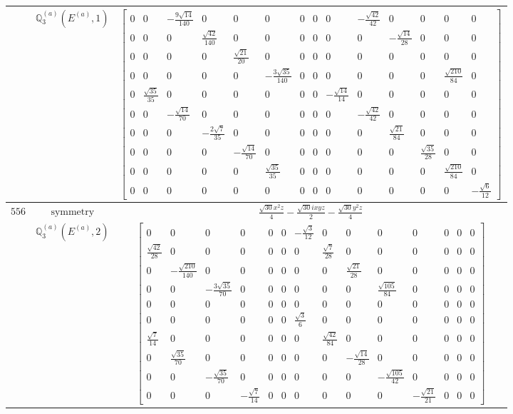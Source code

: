 \documentclass[fleqn,8pt,landscape]{jsarticle}
\begin{document}
\begin{longtable}{ccc}
$  $ & $ \mathbb{Q}_{3}^{(a)}(E^{(a)},1) $ & $ \begin{bmatrix} 0 & 0 & - \frac{9 \sqrt{14}}{140} & 0 & 0 & 0 & 0 & 0 & 0 & - \frac{\sqrt{42}}{42} & 0 & 0 & 0 & 0 \\ 0 & 0 & 0 & \frac{\sqrt{42}}{140} & 0 & 0 & 0 & 0 & 0 & 0 & - \frac{\sqrt{14}}{28} & 0 & 0 & 0 \\ 0 & 0 & 0 & 0 & \frac{\sqrt{21}}{20} & 0 & 0 & 0 & 0 & 0 & 0 & 0 & 0 & 0 \\ 0 & 0 & 0 & 0 & 0 & - \frac{3 \sqrt{35}}{140} & 0 & 0 & 0 & 0 & 0 & 0 & \frac{\sqrt{210}}{84} & 0 \\ 0 & \frac{\sqrt{35}}{35} & 0 & 0 & 0 & 0 & 0 & 0 & - \frac{\sqrt{14}}{14} & 0 & 0 & 0 & 0 & 0 \\ 0 & 0 & - \frac{\sqrt{14}}{70} & 0 & 0 & 0 & 0 & 0 & 0 & - \frac{\sqrt{42}}{42} & 0 & 0 & 0 & 0 \\ 0 & 0 & 0 & - \frac{2 \sqrt{7}}{35} & 0 & 0 & 0 & 0 & 0 & 0 & \frac{\sqrt{21}}{84} & 0 & 0 & 0 \\ 0 & 0 & 0 & 0 & - \frac{\sqrt{14}}{70} & 0 & 0 & 0 & 0 & 0 & 0 & \frac{\sqrt{35}}{28} & 0 & 0 \\ 0 & 0 & 0 & 0 & 0 & \frac{\sqrt{35}}{35} & 0 & 0 & 0 & 0 & 0 & 0 & \frac{\sqrt{210}}{84} & 0 \\ 0 & 0 & 0 & 0 & 0 & 0 & 0 & 0 & 0 & 0 & 0 & 0 & 0 & - \frac{\sqrt{6}}{12} \end{bmatrix} $ \\ \hline
$ 556 $ & $ \text{symmetry} $ & $ \frac{\sqrt{30} x^{2} z}{4} - \frac{\sqrt{30} i x y z}{2} - \frac{\sqrt{30} y^{2} z}{4} $ \\
$  $ & $ \mathbb{Q}_{3}^{(a)}(E^{(a)},2) $ & $ \begin{bmatrix} 0 & 0 & 0 & 0 & 0 & 0 & - \frac{\sqrt{3}}{12} & 0 & 0 & 0 & 0 & 0 & 0 & 0 \\ \frac{\sqrt{42}}{28} & 0 & 0 & 0 & 0 & 0 & 0 & \frac{\sqrt{7}}{28} & 0 & 0 & 0 & 0 & 0 & 0 \\ 0 & - \frac{\sqrt{210}}{140} & 0 & 0 & 0 & 0 & 0 & 0 & \frac{\sqrt{21}}{28} & 0 & 0 & 0 & 0 & 0 \\ 0 & 0 & - \frac{3 \sqrt{35}}{70} & 0 & 0 & 0 & 0 & 0 & 0 & \frac{\sqrt{105}}{84} & 0 & 0 & 0 & 0 \\ 0 & 0 & 0 & 0 & 0 & 0 & 0 & 0 & 0 & 0 & 0 & 0 & 0 & 0 \\ 0 & 0 & 0 & 0 & 0 & 0 & \frac{\sqrt{3}}{6} & 0 & 0 & 0 & 0 & 0 & 0 & 0 \\ \frac{\sqrt{7}}{14} & 0 & 0 & 0 & 0 & 0 & 0 & \frac{\sqrt{42}}{84} & 0 & 0 & 0 & 0 & 0 & 0 \\ 0 & \frac{\sqrt{35}}{70} & 0 & 0 & 0 & 0 & 0 & 0 & - \frac{\sqrt{14}}{28} & 0 & 0 & 0 & 0 & 0 \\ 0 & 0 & - \frac{\sqrt{35}}{70} & 0 & 0 & 0 & 0 & 0 & 0 & - \frac{\sqrt{105}}{42} & 0 & 0 & 0 & 0 \\ 0 & 0 & 0 & - \frac{\sqrt{7}}{14} & 0 & 0 & 0 & 0 & 0 & 0 & - \frac{\sqrt{21}}{21} & 0 & 0 & 0 \end{bmatrix} $ \\ \hline

\end{longtable}
\end{document}
